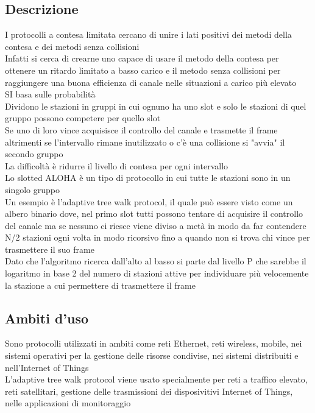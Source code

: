 \documentclass[10pt,oneside,a4paper]{article}
\begin{document}
\subsection{Descrizione}
I protocolli a contesa limitata cercano di unire i lati positivi dei metodi della contesa e dei metodi senza collisioni\\
Infatti si cerca di crearne uno capace di usare il metodo della contesa per ottenere un ritardo limitato a basso carico e il metodo senza collisioni per raggiungere una buona efficienza di canale nelle situazioni a carico più elevato\\
SI basa sulle probabilità\\
Dividono le stazioni in gruppi in cui ognuno ha uno slot e solo le stazioni di quel gruppo possono competere per quello slot\\
Se uno di loro vince acquisisce il controllo del canale e trasmette il frame altrimenti se l'intervallo rimane inutilizzato o c'è una collisione si "avvia" il secondo gruppo\\
La difficoltà è ridurre il livello di contesa per ogni intervallo\\
Lo slotted ALOHA è un tipo di protocollo in cui tutte le stazioni sono in un singolo gruppo\\
Un esempio è l'adaptive tree walk protocol, il quale può essere visto come un albero binario dove, nel primo slot tutti possono tentare di acquisire il controllo del canale ma se nessuno ci riesce viene diviso a metà in modo da far contendere N/2 stazioni ogni volta in modo ricorsivo fino a quando non si trova chi vince per trasmettere il suo frame\\
Dato che l'algoritmo ricerca dall'alto al basso si parte dal livello P che sarebbe il logaritmo in base 2 del numero di stazioni attive per individuare più velocemente la stazione a cui permettere di trasmettere il frame
\subsection{Ambiti d'uso}
Sono protocolli utilizzati in ambiti come reti Ethernet, reti wireless, mobile, nei sistemi operativi per la gestione delle risorse condivise, nei sistemi distribuiti e nell'Internet of Things\\
L'adaptive tree walk protocol viene usato specialmente per reti a traffico elevato, reti satellitari, gestione delle trasmissioni dei disposivitivi Internet of Things, nelle applicazioni di monitoraggio
\end{document}
